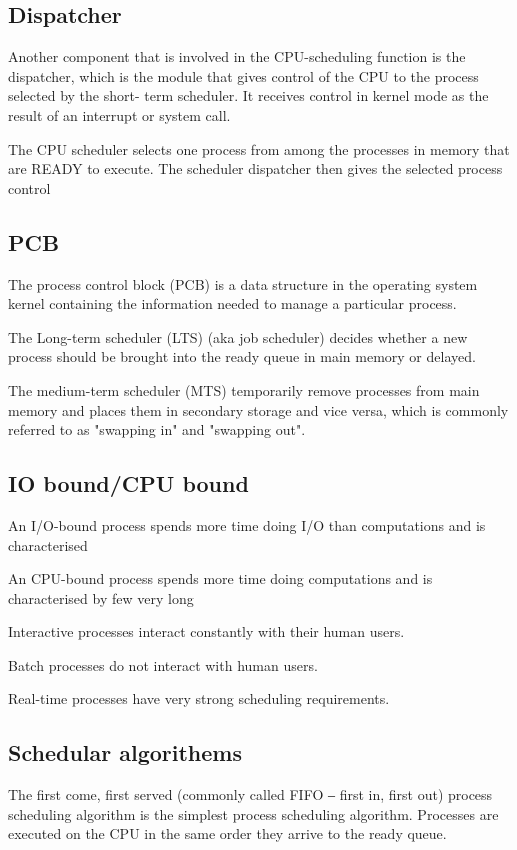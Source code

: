 \begin{multicols}{2}
\subsection{Dispatcher}
Another component that is involved in the
CPU-scheduling function is the dispatcher,
which is the module that gives control of the
CPU to the process selected by the short-
term scheduler. It receives control in kernel
mode as the result of an interrupt or system
call.  \newline

The CPU scheduler selects one process from among the
processes in memory that are READY to execute. The
scheduler dispatcher then gives the selected process control

\subsection{PCB}
The process control block (PCB) is a data
structure in the operating system kernel
containing the information needed to
manage a particular process. \newline

The Long-term scheduler (LTS) (aka job
scheduler) decides whether a new process should
be brought into the ready queue in main memory
or delayed. \newline

The medium-term scheduler (MTS) temporarily remove processes from
main memory and places them in secondary storage and vice versa,
which is commonly referred to as "swapping in" and "swapping out".

\subsection{IO bound/CPU bound}
An I/O-bound process spends
more time doing I/O than
computations and is characterised \newline

An CPU-bound process spends
more time doing computations and
is characterised by few very long

Interactive processes interact constantly with their human
users.  \newline

Batch processes do not interact with human users. \newline

Real-time processes have very strong scheduling
requirements.

\subsection{Schedular algorithems}
The first come, first served (commonly called FIFO ‒ first
in, first out) process scheduling algorithm is the simplest
process scheduling algorithm. Processes are executed on
the CPU in the same order they arrive to the ready queue. \newline



\end{multicols}
